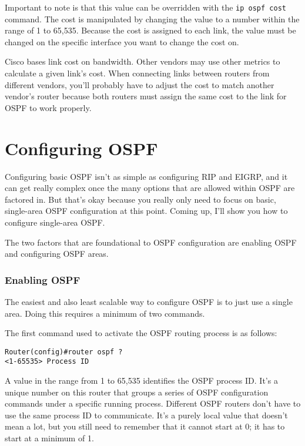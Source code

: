 Important to note is that this value can be overridden with the
\texttt{ip\ ospf\ cost} command. The cost is manipulated by changing the
value to a number within the range of 1 to 65,535. Because the cost is
assigned to each link, the value must be changed on the specific
interface you want to change the cost on.

\begin{note}
Cisco bases link cost on bandwidth.
Other vendors may use other metrics to calculate a given link's cost.
When connecting links between routers from different vendors, you'll probably have to adjust the cost to match another vendor's router
because both routers must assign the same cost to the link for OSPF to work properly.
\end{note}



\section{Configuring OSPF}

Configuring basic OSPF isn't as simple as configuring RIP and EIGRP, and
it can get really complex once the many options that are allowed within
OSPF are factored in. But that's okay because you really only need to
focus on basic, single-area OSPF configuration at this point. Coming up,
I'll show you how to configure single-area OSPF.

The two factors that are foundational to OSPF configuration are enabling
OSPF and configuring OSPF areas.

\subsubsection{Enabling OSPF}

The easiest and also least scalable way to configure OSPF is to just use
a single area. Doing this requires a minimum of two commands.

The first command used to activate the OSPF routing process is as
follows:

\begin{verbatim}
Router(config)#router ospf ?
<1-65535> Process ID
\end{verbatim}

A value in the range from 1 to 65,535 identifies the OSPF process ID.
It's a unique number on this router that groups a series of OSPF
configuration commands under a specific running process. Different OSPF
routers don't have to use the same process ID to communicate. It's a
purely local value that doesn't mean a lot, but you still need to
remember that it cannot start at 0; it has to start at a minimum of 1.

